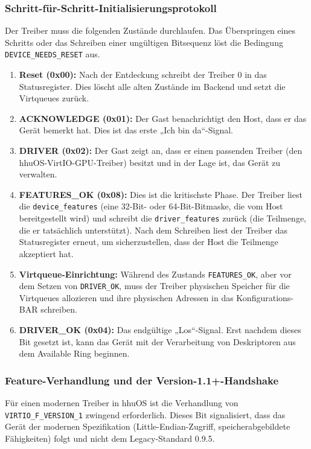 \subsubsection{Schritt-für-Schritt-Initialisierungsprotokoll}
Der Treiber muss die folgenden Zustände durchlaufen. Das Überspringen eines Schritts oder das Schreiben einer ungültigen Bitsequenz löst die Bedingung \texttt{DEVICE\_NEEDS\_RESET} aus.

\begin{enumerate}[label=\textbf{\arabic*.}]
    \item \textbf{Reset (0x00):} Nach der Entdeckung schreibt der Treiber 0 in das Statusregister. Dies löscht alle alten Zustände im Backend und setzt die Virtqueues zurück.
    \item \textbf{ACKNOWLEDGE (0x01):} Der Gast benachrichtigt den Host, dass er das Gerät bemerkt hat. Dies ist das erste „Ich bin da“-Signal.
    \item \textbf{DRIVER (0x02):} Der Gast zeigt an, dass er einen passenden Treiber (den hhuOS-VirtIO-GPU-Treiber) besitzt und in der Lage ist, das Gerät zu verwalten.
    \item \textbf{FEATURES\_OK (0x08):} Dies ist die kritischste Phase. Der Treiber liest die \texttt{device\_features} (eine 32-Bit- oder 64-Bit-Bitmaske, die vom Host bereitgestellt wird) und schreibt die \texttt{driver\_features} zurück (die Teilmenge, die er tatsächlich unterstützt). Nach dem Schreiben liest der Treiber das Statusregister erneut, um sicherzustellen, dass der Host die Teilmenge akzeptiert hat.
    \item \textbf{Virtqueue-Einrichtung:} Während des Zustands \texttt{FEATURES\_OK}, aber vor dem Setzen von \texttt{DRIVER\_OK}, muss der Treiber physischen Speicher für die Virtqueues allozieren und ihre physischen Adressen in das Konfigurations-BAR schreiben.
    \item \textbf{DRIVER\_OK (0x04):} Das endgültige „Los“-Signal. Erst nachdem dieses Bit gesetzt ist, kann das Gerät mit der Verarbeitung von Deskriptoren aus dem Available Ring beginnen.
\end{enumerate}

\subsubsection{Feature-Verhandlung und der Version-1.1+-Handshake}
Für einen modernen Treiber in hhuOS ist die Verhandlung von \texttt{VIRTIO\_F\_VERSION\_1} zwingend erforderlich. Dieses Bit signalisiert, dass das Gerät der modernen Spezifikation (Little-Endian-Zugriff, speicherabgebildete Fähigkeiten) folgt und nicht dem Legacy-Standard 0.9.5.

